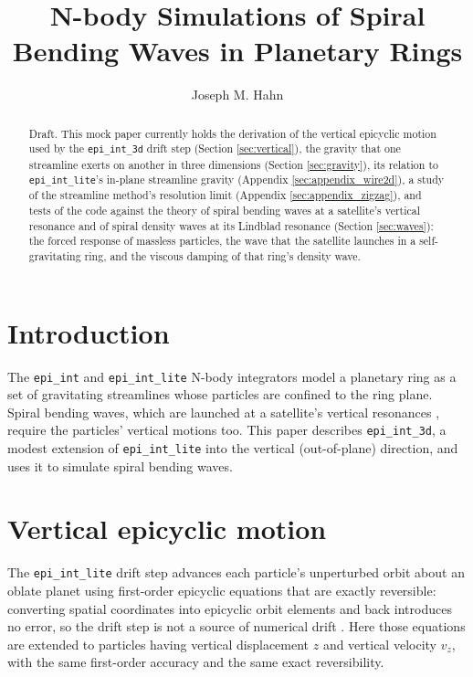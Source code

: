 \documentclass[twocolumn]{aastex702}
\newcommand{\code}[1]{\texttt{#1}}   %
\begin{document}
\title{N-body Simulations of Spiral Bending Waves in Planetary Rings}

\author[gname=Joseph,sname=Hahn]{Joseph M. Hahn}

\begin{abstract}
Draft. This mock paper currently holds the derivation of the vertical
epicyclic motion used by the \code{epi\_int\_3d} drift step (Section \ref{sec:vertical}), the
gravity that one streamline exerts on another in three dimensions (Section \ref{sec:gravity}), its relation to
\code{epi\_int\_lite}'s in-plane streamline gravity (Appendix \ref{sec:appendix_wire2d}), a study of the
streamline method's resolution limit (Appendix \ref{sec:appendix_zigzag}), and tests of the code against the
theory of spiral bending waves at a satellite's vertical resonance and of spiral density waves at its Lindblad
resonance (Section \ref{sec:waves}): the forced response of massless particles, the wave that the
satellite launches in a self-gravitating ring, and the viscous damping of that ring's density wave.
\end{abstract}


\section{Introduction}
\label{sec:intro}

The \code{epi\_int} and \code{epi\_int\_lite} N-body integrators \citep{HS13, H25} model a planetary ring as
a set of gravitating streamlines whose particles are confined to the ring plane. Spiral bending
waves, which are launched at a satellite's vertical resonances \citep{SCL83, S84}, require the
particles' vertical motions too. This paper describes \code{epi\_int\_3d}, a modest extension of
\code{epi\_int\_lite} into the vertical (out-of-plane) direction, and uses it to simulate spiral
bending waves.


\section{Vertical epicyclic motion}
\label{sec:vertical}

The \code{epi\_int\_lite} drift step advances each particle's unperturbed orbit about an oblate planet
using first-order epicyclic equations that are exactly reversible: converting spatial
coordinates into epicyclic orbit elements and back introduces no error, so the drift step
is not a source of numerical drift \citep{H25}. Here those equations are extended to
particles having vertical displacement $z$
and vertical velocity $v_z$, with the same first-order accuracy and the same exact
reversibility.
\end{document}
